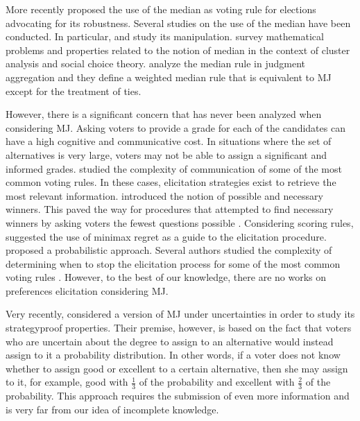 More recently \citet{Bassett1999} proposed the use of the median as voting rule for elections advocating for its robustness.
Several studies on the use of the median have been conducted. In particular, \citet{Bassett1994} and \citet{Gehrlein2003} study its manipulation. \citet{Barthelemy1981} survey mathematical problems and properties related to the notion of median in the context of cluster analysis and social choice theory. \cite{Nehring2022} analyze the median rule in judgment aggregation and they define a weighted median rule that is equivalent to \acs{MJ} except for the treatment of ties.

However, there is a significant concern that has never been analyzed when considering \ac{MJ}. Asking voters to provide a grade for each of the candidates can have a high cognitive and communicative cost. In situations where the set of alternatives is very large, voters may not be able to assign a significant and informed grades. \citet{Conitzer2005} studied the complexity of communication of some of the most common voting rules.
In these cases, elicitation strategies exist to retrieve the most relevant information. \citet{Konczak05} introduced the notion of possible and necessary winners. This paved the way for procedures that attempted to find necessary winners by asking voters the fewest questions possible \citep{Kalech2011}.
Considering scoring rules, \citet{Lu2011} suggested the use of minimax regret as a guide to the elicitation procedure. \citet{Bachrach2010} proposed a probabilistic approach. Several authors studied the complexity of determining when to stop the elicitation process for some of the most common voting rules \citep{Conitzer2002, Walsh2009}.
However, to the best of our knowledge, there are no works on preferences elicitation considering \ac{MJ}.

Very recently, \citet{Varloot2022} considered a version of \ac{MJ} under uncertainties in order to study its strategyproof properties. Their premise, however, is based on the fact that voters who are uncertain about the degree to assign to an alternative would instead assign to it a probability distribution. In other words, if a voter does not know whether to assign good or excellent to a certain alternative, then she may assign to it, for example, good with $\frac{1}{3}$ of the probability and excellent with $\frac{2}{3}$ of the probability. 
This approach requires the submission of even more information and is very far from our idea of incomplete knowledge.


